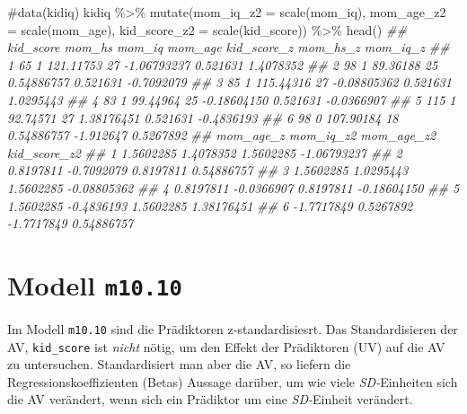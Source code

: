 \documentclass[
  a4paper,
  DIV=11]{scrreprt}
\newenvironment{Shaded}{\begin{snugshade}}{\end{snugshade}}
\newcommand{\AttributeTok}[1]{\textcolor[rgb]{0.40,0.45,0.13}{#1}}
\newcommand{\CommentTok}[1]{\textcolor[rgb]{0.37,0.37,0.37}{#1}}
\newcommand{\DocumentationTok}[1]{\textcolor[rgb]{0.37,0.37,0.37}{\textit{#1}}}
\newcommand{\FunctionTok}[1]{\textcolor[rgb]{0.28,0.35,0.67}{#1}}
\newcommand{\NormalTok}[1]{\textcolor[rgb]{0.00,0.23,0.31}{#1}}
\newcommand{\SpecialCharTok}[1]{\textcolor[rgb]{0.37,0.37,0.37}{#1}}
\theoremstyle{definition}
\theoremstyle{remark}
\begin{document}
\begin{Shaded}
\begin{Highlighting}[]
\CommentTok{\#data(kidiq)}
\NormalTok{kidiq }\SpecialCharTok{\%\textgreater{}\%} 
  \FunctionTok{mutate}\NormalTok{(}\AttributeTok{mom\_iq\_z2 =} \FunctionTok{scale}\NormalTok{(mom\_iq),}
         \AttributeTok{mom\_age\_z2 =} \FunctionTok{scale}\NormalTok{(mom\_age),}
         \AttributeTok{kid\_score\_z2 =} \FunctionTok{scale}\NormalTok{(kid\_score)) }\SpecialCharTok{\%\textgreater{}\%} 
  \FunctionTok{head}\NormalTok{()}
\DocumentationTok{\#\#   kid\_score mom\_hs    mom\_iq mom\_age kid\_score\_z  mom\_hs\_z   mom\_iq\_z}
\DocumentationTok{\#\# 1        65      1 121.11753      27 {-}1.06793237  0.521631  1.4078352}
\DocumentationTok{\#\# 2        98      1  89.36188      25  0.54886757  0.521631 {-}0.7092079}
\DocumentationTok{\#\# 3        85      1 115.44316      27 {-}0.08805362  0.521631  1.0295443}
\DocumentationTok{\#\# 4        83      1  99.44964      25 {-}0.18604150  0.521631 {-}0.0366907}
\DocumentationTok{\#\# 5       115      1  92.74571      27  1.38176451  0.521631 {-}0.4836193}
\DocumentationTok{\#\# 6        98      0 107.90184      18  0.54886757 {-}1.912647  0.5267892}
\DocumentationTok{\#\#    mom\_age\_z  mom\_iq\_z2 mom\_age\_z2 kid\_score\_z2}
\DocumentationTok{\#\# 1  1.5602285  1.4078352  1.5602285  {-}1.06793237}
\DocumentationTok{\#\# 2  0.8197811 {-}0.7092079  0.8197811   0.54886757}
\DocumentationTok{\#\# 3  1.5602285  1.0295443  1.5602285  {-}0.08805362}
\DocumentationTok{\#\# 4  0.8197811 {-}0.0366907  0.8197811  {-}0.18604150}
\DocumentationTok{\#\# 5  1.5602285 {-}0.4836193  1.5602285   1.38176451}
\DocumentationTok{\#\# 6 {-}1.7717849  0.5267892 {-}1.7717849   0.54886757}
\end{Highlighting}
\end{Shaded}

\hypertarget{modell-m10.10}{%
\section{\texorpdfstring{Modell
\texttt{m10.10}}{Modell m10.10}}\label{modell-m10.10}}

Im Modell \texttt{m10.10} sind die Prädiktoren z-standardisiesrt. Das
Standardisieren der AV, \texttt{kid\_score} ist \emph{nicht} nötig, um
den Effekt der Prädiktoren (UV) auf die AV zu untersuchen.
Standardisiert man aber die AV, so liefern die Regressionskoeffizienten
(Betas) Aussage darüber, um wie viele \emph{SD-}Einheiten sich die AV
verändert, wenn sich ein Prädiktor um eine \emph{SD-}Einheit verändert.
\end{document}
